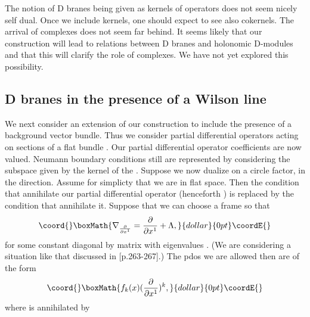 \documentclass[a4paper,11pt]{amsart}
\begin{document}
The notion of D branes being given as kernels of operators does not seem nicely 
self dual. Once we include kernels, one should expect to see also cokernels. 
The arrival of complexes does not seem far behind. It seems likely that our
construction will lead to relations between D branes and holonomic D-modules and
that this will clarify the role of complexes. We have not yet explored this 
possibility.

\subsection{D branes in the presence of a Wilson line}
We next consider an extension of our construction to include the presence of a
background vector bundle. Thus we consider partial differential operators 
acting on sections of a flat \coordHE{} bundle \coordHE{}. Our partial differential
 operator coefficients are now \coordHE{} valued. Neumann boundary
conditions still are represented by considering the subspace given by the 
kernel of the \coordHE{}. Suppose we now \coordHE{} 
dualize on a circle factor, in the \coordHE{} direction. Assume for simplicty
 that we are in flat space. Then the condition that 
\coordHE{} annihilate our partial differential operator (henceforth \coordHE{})
 is replaced by the condition that  
\coordHE{} annihilate it. Suppose that 
we can choose a frame so that 
$$\coord{}\boxMath{\nabla_{\frac{\partial}{\partial x^1}} = \frac{\partial}{\partial x^1} + \Lambda,}{dollar}{0pt}\coordE{}$$
for some constant diagonal \coordHE{} by \coordHE{} matrix \myHighlight{$\Lambda$}\coordHE{} with eigenvalues
\coordHE{}. (We are considering a situation like that discussed
in \cite{P}[p.263-267].) The pdos we are allowed then are of the form 
$$\coord{}\boxMath{f_k(x)(\frac{\partial}{\partial x^1})^k,}{dollar}{0pt}\coordE{}$$ 
where 
\coordHE{} is annihilated by \coordHE{}  
\end{document}
